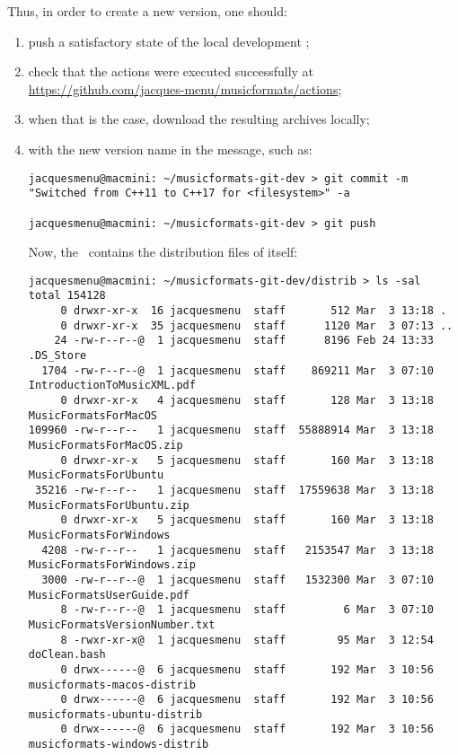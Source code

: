 Thus, in order to create a new version, one should:
\begin{enumerate}
\item push a satisfactory state of the local development \repo;

\item check that the actions were executed successfully at \url{https://github.com/jacques-menu/musicformats/actions};

\item when that is the case, download the resulting  archives locally;

\item {} with the new version name in the  message, such as:
\begin{lstlisting}[language=Terminal]
jacquesmenu@macmini: ~/musicformats-git-dev > git commit -m "Switched from C++11 to C++17 for <filesystem>" -a 

jacquesmenu@macmini: ~/musicformats-git-dev > git push
\end{lstlisting}

Now, the \masterBranch\ contains the distribution files of itself:
\begin{lstlisting}[language=Terminal]
jacquesmenu@macmini: ~/musicformats-git-dev/distrib > ls -sal
total 154128
     0 drwxr-xr-x  16 jacquesmenu  staff       512 Mar  3 13:18 .
     0 drwxr-xr-x  35 jacquesmenu  staff      1120 Mar  3 07:13 ..
    24 -rw-r--r--@  1 jacquesmenu  staff      8196 Feb 24 13:33 .DS_Store
  1704 -rw-r--r--@  1 jacquesmenu  staff    869211 Mar  3 07:10 IntroductionToMusicXML.pdf
     0 drwxr-xr-x   4 jacquesmenu  staff       128 Mar  3 13:18 MusicFormatsForMacOS
109960 -rw-r--r--   1 jacquesmenu  staff  55888914 Mar  3 13:18 MusicFormatsForMacOS.zip
     0 drwxr-xr-x   5 jacquesmenu  staff       160 Mar  3 13:18 MusicFormatsForUbuntu
 35216 -rw-r--r--   1 jacquesmenu  staff  17559638 Mar  3 13:18 MusicFormatsForUbuntu.zip
     0 drwxr-xr-x   5 jacquesmenu  staff       160 Mar  3 13:18 MusicFormatsForWindows
  4208 -rw-r--r--   1 jacquesmenu  staff   2153547 Mar  3 13:18 MusicFormatsForWindows.zip
  3000 -rw-r--r--@  1 jacquesmenu  staff   1532300 Mar  3 07:10 MusicFormatsUserGuide.pdf
     8 -rw-r--r--@  1 jacquesmenu  staff         6 Mar  3 07:10 MusicFormatsVersionNumber.txt
     8 -rwxr-xr-x@  1 jacquesmenu  staff        95 Mar  3 12:54 doClean.bash
     0 drwx------@  6 jacquesmenu  staff       192 Mar  3 10:56 musicformats-macos-distrib
     0 drwx------@  6 jacquesmenu  staff       192 Mar  3 10:56 musicformats-ubuntu-distrib
     0 drwx------@  6 jacquesmenu  staff       192 Mar  3 10:56 musicformats-windows-distrib
\end{lstlisting}


\end{enumerate}
